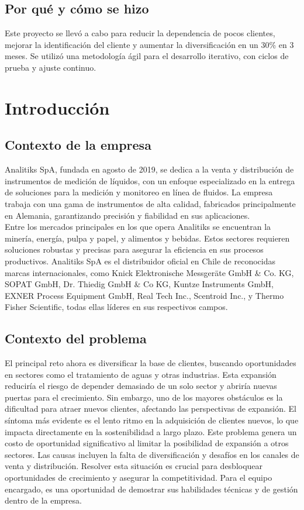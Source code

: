 \documentclass[12pt]{article}
\begin{document}
\subsection{Por qué y cómo se hizo}
Este proyecto se llevó a cabo para reducir la dependencia de pocos clientes, mejorar la identificación del cliente y aumentar la diversificación en un 30\% en 3 meses. Se utilizó una metodología ágil para el desarrollo iterativo, con ciclos de prueba y ajuste continuo.

\newpage

\section{Introducción}

\subsection{Contexto de la empresa}
\noindent
Analitiks SpA, fundada en agosto de 2019, se dedica a la venta y distribución de instrumentos de medición de líquidos, con un enfoque especializado en la entrega de soluciones para la medición y monitoreo en línea de fluidos. La empresa trabaja con una gama de instrumentos de alta calidad, fabricados principalmente en Alemania, garantizando precisión y fiabilidad en sus aplicaciones.\\
Entre los mercados principales en los que opera Analitiks se encuentran la minería, energía, pulpa y papel, y alimentos y bebidas. Estos sectores requieren soluciones robustas y precisas para asegurar la eficiencia en sus procesos productivos.
Analitiks SpA es el distribuidor oficial en Chile de reconocidas marcas internacionales, como Knick Elektronische Messgeräte GmbH \& Co. KG, SOPAT GmbH, Dr. Thiedig GmbH \& Co KG, Kuntze Instruments GmbH, EXNER Process Equipment GmbH, Real Tech Inc., Scentroid Inc., y Thermo Fisher Scientific, todas ellas líderes en sus respectivos campos.


\subsection{Contexto del problema}
\noindent
El principal reto ahora es diversificar la base de clientes, buscando oportunidades en sectores como el tratamiento de aguas y otras industrias. Esta expansión reduciría el riesgo de depender demasiado de un solo sector y abriría nuevas puertas para el crecimiento. Sin embargo, uno de los mayores obstáculos es la dificultad para atraer nuevos clientes, afectando las perspectivas de expansión. El síntoma más evidente es el lento ritmo en la adquisición de clientes nuevos, lo que impacta directamente en la sostenibilidad a largo plazo. Este problema genera un costo de oportunidad significativo al limitar la posibilidad de expansión a otros sectores. Las causas incluyen la falta de diversificación y desafíos en los canales de venta y distribución.
Resolver esta situación es crucial para desbloquear oportunidades de crecimiento y asegurar la competitividad. Para el equipo encargado, es una oportunidad de demostrar sus habilidades técnicas y de gestión dentro de la empresa.
\end{document}
